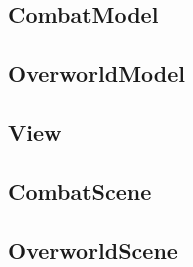 \subsection{CombatModel}

\subsection{OverworldModel}

\subsection{View}

\subsection{CombatScene}

\subsection{OverworldScene}
